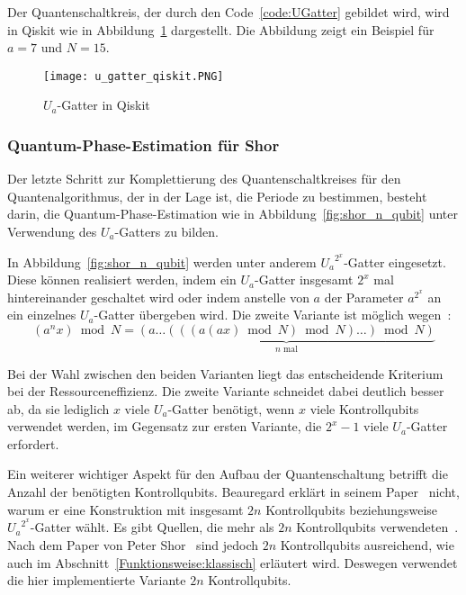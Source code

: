 Der Quantenschaltkreis, der durch den Code~\ref{code:UGatter} gebildet wird, 
wird in Qiskit wie in Abbildung~\ref{fig:u_gatter_qiskit} dargestellt. 
Die Abbildung zeigt ein Beispiel für \(a=7\) und \(N=15\).

\begin{figure}[H]
  \centering
  \texttt{[image: u\_gatter\_qiskit.PNG]}
  \caption{\(U_a\)-Gatter in Qiskit}
  \label{fig:u_gatter_qiskit}
\end{figure}

\subsubsection{Quantum-Phase-Estimation für Shor} \label{section:imp_QPE_Shor}
Der letzte Schritt zur Komplettierung des Quantenschaltkreises für den Quantenalgorithmus, 
der in der Lage ist, 
die Periode zu bestimmen, besteht darin, 
die Quantum-Phase-Estimation wie in Abbildung~\ref{fig:shor_n_qubit} unter Verwendung des \(U_a\)-Gatters zu bilden.

In Abbildung~\ref{fig:shor_n_qubit} werden unter anderem \({U_a}^{2^x}\)-Gatter eingesetzt.
Diese können realisiert werden, 
indem ein \({U_a}\)-Gatter insgesamt \(2^x\) mal hintereinander geschaltet wird oder 
indem anstelle von \(a\) der Parameter \(a^{2^x}\) an ein einzelnes \(U_a\)-Gatter übergeben wird.
Die zweite Variante ist möglich wegen~\cite{beauregard2003circuit}:
\[(a^nx)\bmod N = \underbrace{(a\dotsc(((a(ax)\bmod N)\bmod N)\dotsc)\bmod N)}_{\text{\(n\) mal}}\]

Bei der Wahl zwischen den beiden Varianten liegt das entscheidende Kriterium bei der Ressourceneffizienz. 
Die zweite Variante schneidet dabei deutlich besser ab, 
da sie lediglich \(x\) viele \(U_a\)-Gatter benötigt, 
wenn \(x\) viele Kontrollqubits verwendet werden, 
im Gegensatz zur ersten Variante, die \(2^x-1\) viele \(U_a\)-Gatter erfordert.

Ein weiterer wichtiger Aspekt für den Aufbau der Quantenschaltung betrifft die Anzahl der benötigten Kontrollqubits.
Beauregard erklärt in seinem Paper~\cite{beauregard2003circuit} nicht, 
warum er eine Konstruktion mit insgesamt \(2n\) Kontrollqubits beziehungsweise \({U_a}^{2^x}\)-Gatter wählt.
Es gibt Quellen, die mehr als \(2n\)  Kontrollqubits verwendeten~\cite[229]{nielsen_chuang_2010}.
Nach dem Paper von Peter Shor~\cite{Shor_1997} sind jedoch \(2n\) Kontrollqubits ausreichend,
wie auch im Abschnitt~\ref{Funktionsweise:klassisch} erläutert wird.
Deswegen verwendet die hier implementierte Variante \(2n\) Kontrollqubits.

